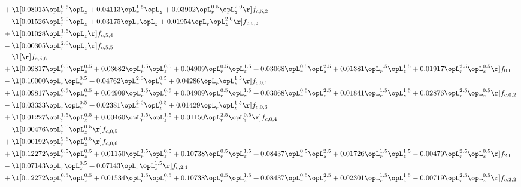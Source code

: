 \begin{alignat}{2}
& + \l[  0.08015 \opL_r^{0.5} \opL_z +  0.04113 \opL_r^{1.5} \opL_z +  0.03902 \opL_r^{0.5} \opL_z^{2.0}  \r] f_{c,5,2} \nonumber \\ 
& - \l[  0.01526 \opL_r^{2.0} \opL_z +  0.03175 \opL_r \opL_z +  0.01954 \opL_r \opL_z^{2.0}  \r] f_{c,5,3} \nonumber \\ 
& + \l[  0.01028 \opL_r^{1.5} \opL_z  \r] f_{c,5,4} \nonumber \\ 
& - \l[  0.00305 \opL_r^{2.0} \opL_z  \r] f_{c,5,5} \nonumber \\ 
& - \l[  \r] f_{c,5,6} \nonumber \\ 
& + \l[  0.09817 \opL_r^{0.5} \opL_z^{0.5} +  0.03682 \opL_r^{1.5} \opL_z^{0.5} +  0.04909 \opL_r^{0.5} \opL_z^{1.5} +  0.03068 \opL_r^{0.5} \opL_z^{2.5} +  0.01381 \opL_r^{1.5} \opL_z^{1.5} +  0.01917 \opL_r^{2.5} \opL_z^{0.5}  \r] f_{0,0} \nonumber \\ 
& - \l[  0.10000 \opL_r \opL_z^{0.5} +  0.04762 \opL_r^{2.0} \opL_z^{0.5} +  0.04286 \opL_r \opL_z^{1.5}  \r] f_{c,0,1} \nonumber \\ 
& + \l[  0.09817 \opL_r^{0.5} \opL_z^{0.5} +  0.04909 \opL_r^{1.5} \opL_z^{0.5} +  0.04909 \opL_r^{0.5} \opL_z^{1.5} +  0.03068 \opL_r^{0.5} \opL_z^{2.5} +  0.01841 \opL_r^{1.5} \opL_z^{1.5} +  0.02876 \opL_r^{2.5} \opL_z^{0.5}  \r] f_{c,0,2} \nonumber \\ 
& - \l[  0.03333 \opL_r \opL_z^{0.5} +  0.02381 \opL_r^{2.0} \opL_z^{0.5} +  0.01429 \opL_r \opL_z^{1.5}  \r] f_{c,0,3} \nonumber \\ 
& + \l[  0.01227 \opL_r^{1.5} \opL_z^{0.5} +  0.00460 \opL_r^{1.5} \opL_z^{1.5} +  0.01150 \opL_r^{2.5} \opL_z^{0.5}  \r] f_{c,0,4} \nonumber \\ 
& - \l[  0.00476 \opL_r^{2.0} \opL_z^{0.5}  \r] f_{c,0,5} \nonumber \\ 
& + \l[  0.00192 \opL_r^{2.5} \opL_z^{0.5}  \r] f_{c,0,6} \nonumber \\ 
& + \l[  0.12272 \opL_r^{0.5} \opL_z^{0.5} +  0.01150 \opL_r^{1.5} \opL_z^{0.5} +  0.10738 \opL_r^{0.5} \opL_z^{1.5} +  0.08437 \opL_r^{0.5} \opL_z^{2.5} +  0.01726 \opL_r^{1.5} \opL_z^{1.5}   -0.00479 \opL_r^{2.5} \opL_z^{0.5}  \r] f_{2,0} \nonumber \\ 
& - \l[  0.07143 \opL_r \opL_z^{0.5} +  0.07143 \opL_r \opL_z^{1.5}  \r] f_{c,2,1} \nonumber \\ 
& + \l[  0.12272 \opL_r^{0.5} \opL_z^{0.5} +  0.01534 \opL_r^{1.5} \opL_z^{0.5} +  0.10738 \opL_r^{0.5} \opL_z^{1.5} +  0.08437 \opL_r^{0.5} \opL_z^{2.5} +  0.02301 \opL_r^{1.5} \opL_z^{1.5}   -0.00719 \opL_r^{2.5} \opL_z^{0.5}  \r] f_{c,2,2} \nonumber \\ 

\end{alignat}
